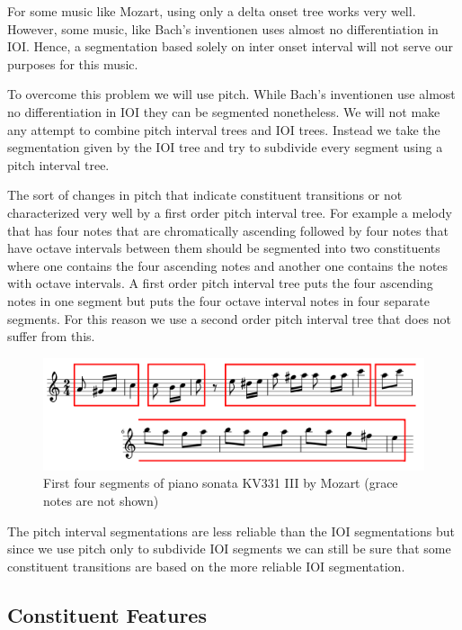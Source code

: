 \documentclass[a4paper,10pt]{article}
\begin{document}
For some music like Mozart, using only a delta onset tree works very well. However, some music, like Bach's inventionen uses almost no differentiation in IOI. Hence, a segmentation based solely on inter onset interval will not serve our purposes for this music.

To overcome this problem we will use pitch. While Bach's inventionen use almost no differentiation in IOI they can be segmented nonetheless. We will not make any attempt to combine pitch interval trees and IOI trees. Instead we take the segmentation given by the IOI tree and try to subdivide every segment using a pitch interval tree. 

The sort of changes in pitch that indicate constituent transitions or not characterized very well by a first order pitch interval tree. For example a melody that has four notes that are chromatically ascending followed by four notes that have octave intervals between them should be segmented into two constituents where one contains the four ascending notes and another one contains the notes with octave intervals. A first order pitch interval tree puts the four ascending notes in one segment but puts the four octave interval notes in four separate segments. For this reason we use a second order pitch interval tree that does not suffer from this. 

\begin{figure}
\includegraphics[scale=3]{img/melodysegments}
\caption{First four segments of piano sonata KV331 III by Mozart (grace notes are not shown)}
\label{fig:mozartsegments}
\end{figure}

The pitch interval segmentations are less reliable than the IOI segmentations but since we use pitch only to subdivide IOI segments we can still be sure that some constituent transitions are based on the more reliable IOI segmentation.

\subsection{Constituent Features}
\label{sec:scorefeatures}
\end{document}
